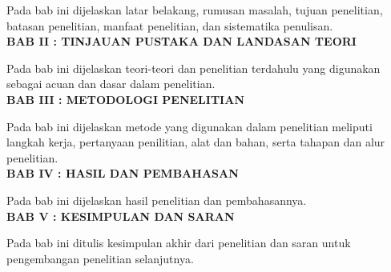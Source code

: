 Pada bab ini dijelaskan latar belakang, rumusan masalah, tujuan penelitian, batasan penelitian, manfaat penelitian, dan sistematika penulisan.\\

\noindent
\textbf{BAB II : TINJAUAN PUSTAKA DAN LANDASAN TEORI}

Pada bab ini dijelaskan teori-teori dan penelitian terdahulu yang digunakan sebagai acuan dan dasar dalam penelitian.\\

\noindent
\textbf{BAB III : METODOLOGI PENELITIAN}

Pada bab ini dijelaskan metode yang digunakan dalam penelitian meliputi langkah kerja, pertanyaan penilitian, alat dan bahan, serta tahapan dan alur
penelitian.\\

\noindent
\textbf{BAB IV : HASIL DAN PEMBAHASAN}

Pada bab ini dijelaskan hasil penelitian dan pembahasannya.\\

\noindent
\textbf{BAB V : KESIMPULAN DAN SARAN}

Pada bab ini ditulis kesimpulan akhir dari penelitian dan saran untuk pengembangan penelitian selanjutnya.\\